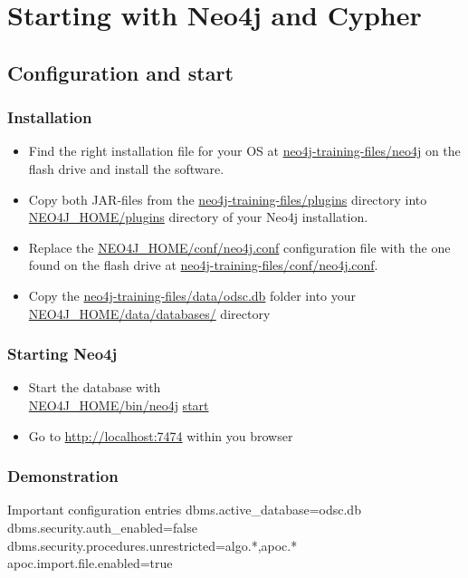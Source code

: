 \documentclass[12pt]{beamer}
\begin{document}
    \section{Starting with Neo4j and Cypher}
    \subsection{Configuration and start}
    \begin{frame}
        \frametitle{Installation}
        \begin{itemize}
            \item Find the right installation file for your OS at \textcolor{white}{\url{neo4j-training-files/neo4j}} on the flash drive and install the software.
            \pause
            \item Copy both JAR-files from the \textcolor{white}{\url{neo4j-training-files/plugins}} directory into \textcolor{white}{\url{NEO4J_HOME/plugins}} directory of your Neo4j installation.
            \pause
            \item Replace the \textcolor{white}{\url{NEO4J_HOME/conf/neo4j.conf}} configuration file with the one found on the flash drive at \textcolor{white}{\url{neo4j-training-files/conf/neo4j.conf}}.
            \pause
            \item Copy the \textcolor{white}{\url{neo4j-training-files/data/odsc.db}} folder into your \textcolor{white}{\url{NEO4J_HOME/data/databases/}} directory
        \end{itemize}
    \end{frame}
    
    \begin{frame}
        \frametitle{Starting Neo4j}
        \begin{itemize}
            \item Start the database with\\
            \textcolor{white}{\url{NEO4J_HOME/bin/neo4j} \url{start}}
            \pause
            \item Go to \textcolor{white}{\url{http://localhost:7474}} within you browser
        \end{itemize}
    \end{frame}
    
    \begin{frame}
        \frametitle{Demonstration}
        \begin{block}{Important configuration entries}
            dbms.active\_database=odsc.db\\
            dbms.security.auth\_enabled=false\\
            dbms.security.procedures.unrestricted=algo.*,apoc.*\\
            apoc.import.file.enabled=true
        \end{block}
    \end{frame}
    
\end{document}
